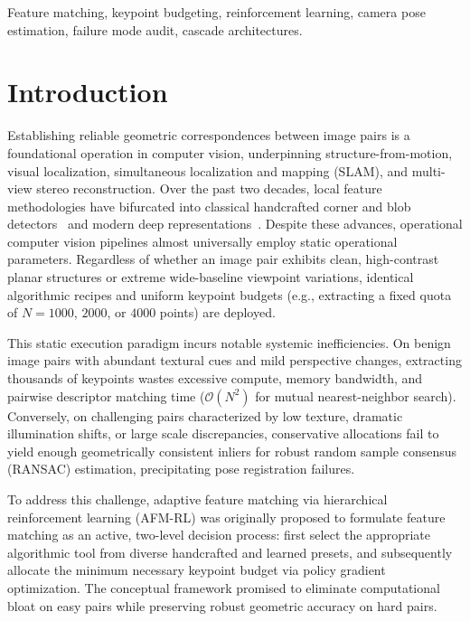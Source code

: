 \documentclass[conference]{IEEEtran}
\begin{document}
\begin{IEEEkeywords}
Feature matching, keypoint budgeting, reinforcement learning, camera pose estimation, failure mode audit, cascade architectures.
\end{IEEEkeywords}

\section{Introduction}
\label{sec:intro}

Establishing reliable geometric correspondences between image pairs is a foundational operation in computer vision, underpinning structure-from-motion, visual localization, simultaneous localization and mapping (SLAM), and multi-view stereo reconstruction. Over the past two decades, local feature methodologies have bifurcated into classical handcrafted corner and blob detectors~\cite{lowe2004sift,rublee2011orb,bay2006surf,alcantarilla2012kaze,alcantarilla2013akaze,leutenegger2011brisk,alahi2012freak} and modern deep representations~\cite{detone2018superpoint,dusmanu2019d2net,tyszkiewicz2020disk,zhao2023aliked,edstedt2024dedode,potje2024xfeat,sarlin2020superglue,lindenberger2023lightglue,sun2021loftr}. Despite these advances, operational computer vision pipelines almost universally employ static operational parameters. Regardless of whether an image pair exhibits clean, high-contrast planar structures or extreme wide-baseline viewpoint variations, identical algorithmic recipes and uniform keypoint budgets (e.g., extracting a fixed quota of $N = 1000$, $2000$, or $4000$ points) are deployed.

This static execution paradigm incurs notable systemic inefficiencies. On benign image pairs with abundant textural cues and mild perspective changes, extracting thousands of keypoints wastes excessive compute, memory bandwidth, and pairwise descriptor matching time ($\mathcal{O}(N^2)$ for mutual nearest-neighbor search). Conversely, on challenging pairs characterized by low texture, dramatic illumination shifts, or large scale discrepancies, conservative allocations fail to yield enough geometrically consistent inliers for robust random sample consensus (RANSAC) estimation, precipitating pose registration failures.

To address this challenge, adaptive feature matching via hierarchical reinforcement learning (AFM-RL) was originally proposed to formulate feature matching as an active, two-level decision process: first select the appropriate algorithmic tool from diverse handcrafted and learned presets, and subsequently allocate the minimum necessary keypoint budget via policy gradient optimization. The conceptual framework promised to eliminate computational bloat on easy pairs while preserving robust geometric accuracy on hard pairs.
\end{document}
